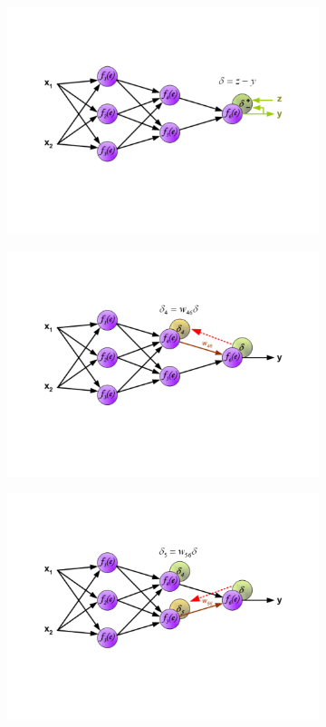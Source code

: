 \documentclass[a4paper,10pt]{article}
\begin{document}
 \begin{figure}[h!]
  \centering
  \begin{subfigure}[b]{0.3\linewidth}
   \includegraphics[width=\linewidth]{BackPropa.png}
  \end{subfigure}
  \begin{subfigure}[b]{0.3\linewidth}
   \includegraphics[width=\linewidth]{BackPropb.png}
  \end{subfigure}
  \begin{subfigure}[b]{0.3\linewidth}
   \includegraphics[width=\linewidth]{BackPropc.png}

\end{subfigure}
\end{figure}
\end{document}
